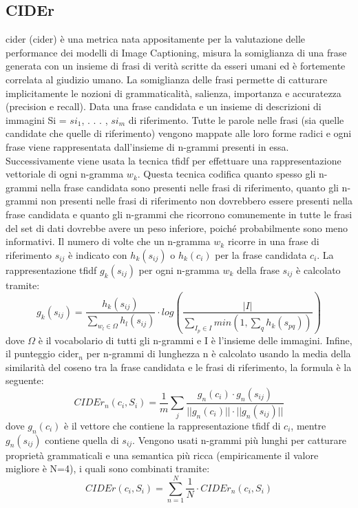 \subsection{CIDEr}\label{cider}
\acrshort{cider} (\acrlong{cider}) \cite{vedantam2015cider} è una metrica nata appositamente per la valutazione delle performance dei modelli di Image Captioning, misura la somiglianza di una frase generata con un insieme di frasi di verità scritte da esseri umani ed è fortemente correlata al giudizio umano. La somiglianza delle frasi permette di catturare implicitamente le nozioni di grammaticalità, salienza, importanza e accuratezza (precision e recall).
Data una frase candidata e un insieme di descrizioni di immagini Si = {$si_1$, . . . , $si_m$} di riferimento. Tutte le parole nelle frasi (sia quelle candidate che quelle di riferimento) vengono mappate alle loro forme radici e ogni frase viene rappresentata dall'insieme di n-grammi presenti in essa.
Successivamente viene usata la tecnica \acrfull{tfidf} per effettuare una rappresentazione vettoriale di ogni n-gramma $w_k$. Questa tecnica codifica quanto spesso gli n-grammi nella frase candidata sono presenti nelle frasi di riferimento, quanto gli n-grammi non presenti nelle frasi di riferimento non dovrebbero essere presenti nella frase candidata e quanto gli n-grammi che ricorrono comunemente in tutte le frasi del set di dati dovrebbe avere un peso inferiore, poiché probabilmente sono meno informativi. 
Il numero di volte che un n-gramma $w_k$ ricorre in una frase di riferimento $s_{ij}$ è indicato con $h_k(s_{ij})$ o $h_k(c_i)$ per la frase candidata $c_i$.
La rappresentazione \acrshort{tfidf} $g_k(s_{ij})$ per ogni n-gramma $w_k$ della frase $s_{ij}$ è calcolato tramite:
\begin{equation*}
g_k(s_{ij}) = \frac{h_k(s_{ij})}{\sum_{w_l\in \Omega} h_l(s_{ij})} \cdot log(\frac{|I|}{\sum_{I_p \in I} min(1, \sum_q h_k (s_{pq}))})
\end{equation*}
dove $\Omega$ è il vocabolario di tutti gli n-grammi e I è l'insieme delle immagini.
Infine, il punteggio \acrshort{cider}$_n$ per n-grammi di lunghezza n è calcolato usando la media della similarità del coseno tra la frase candidata e le frasi di riferimento, la formula è la seguente:
\begin{equation*}
CIDEr_n(c_i, S_i) = \frac{1}{m} \sum_j \frac{g_n(c_i) \cdot g_n(s_{ij})} {||g_n(c_i)|| \cdot ||g_n(s_{ij}) ||}
\end{equation*}
dove $g_n(c_i)$ è il vettore che contiene la rappresentazione \acrshort{tfidf} di $c_i$, mentre $g_n(s_{ij})$ contiene quella di $s_{ij}$.
Vengono usati n-grammi più lunghi per catturare proprietà grammaticali e una semantica più ricca (empiricamente il valore migliore è N=4), i quali sono combinati tramite:
\begin{equation*}
CIDEr(c_i, S_i) = \sum^N_{n=1} \frac{1}{N} \cdot CIDEr_n(c_i, S_i)
\end{equation*}
